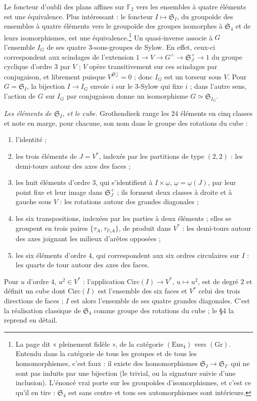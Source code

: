 \documentclass[11pt,a4paper]{article}
\begin{document}
Le foncteur d'oubli des plans affines sur $\mathbb{F}_2$ vers les ensembles à
quatre éléments est une équivalence. Plus intéressant : le foncteur
$I \mapsto \mathfrak{S}_I$, du groupoïde des ensembles à quatre éléments vers le
groupoïde des groupes isomorphes à $\mathfrak{S}_4$ et de leurs isomorphismes,
est une équivalence.\footnote{La page dit « pleinement fidèle », de la
catégorie $(\mathrm{Ens}_4)$ vers $(\mathrm{Gr})$. Entendu dans la catégorie de
tous les groupes et de tous les homomorphismes, c'est faux : il existe des
homomorphismes $\mathfrak{S}_I \to \mathfrak{S}_{I'}$ qui ne sont pas induits
par une bijection (le trivial, ou la signature suivie d'une inclusion). L'énoncé
vrai porte sur les groupoïdes d'isomorphismes, et c'est ce qu'il en tire :
$\mathfrak{S}_4$ est sans centre et tous ses automorphismes sont intérieurs.} Un
quasi-inverse associe à $G$ l'ensemble $I_G$ de ses quatre $3$-sous-groupes de
Sylow. En effet, ceux-ci correspondent aux scindages de l'extension
$1 \to V \to G^{+} \to \mathfrak{S}_J^{+} \to 1$ du groupe cyclique d'ordre $3$
par $V$ ; $V$ opère transitivement sur ces scindages par conjugaison, et
librement puisque $V^{\mathfrak{S}_J^{+}} = 0$ ; donc $I_G$ est un torseur sous
$V$. Pour $G = \mathfrak{S}_I$, la bijection $I \to I_G$ envoie $i$ sur le
$3$-Sylow qui fixe $i$ ; dans l'autre sens, l'action de $G$ sur $I_G$ par
conjugaison donne un isomorphisme $G \simeq \mathfrak{S}_{I_G}$.

\emph{Les éléments de $\mathfrak{S}_I$, et le cube.} Grothendieck range les
$24$ éléments en cinq classes et note en marge, pour chacune, son nom dans le
groupe des rotations du cube :
\begin{enumerate}
\item[a)] l'identité ;
\item[b)] les trois éléments de $J = V^{*}$, indexés par les partitions de type
$(2,2)$ : les demi-tours autour des axes des faces ;
\item[c)] les huit éléments d'ordre $3$, qui s'identifient à
$I \times \underline{\omega}$, $\underline{\omega} = \underline{\omega}(J)$, par
leur point fixe et leur image dans $\mathfrak{S}_J^{+}$ ; ils forment deux
classes à droite et à gauche sous $V$ : les rotations autour des grandes
diagonales ;
\item[d)] les six transpositions, indexées par les parties à deux éléments ;
elles se groupent en trois paires $\{\tau_A, \tau_{I \setminus A}\}$, de produit
dans $V^{*}$ : les demi-tours autour des axes joignant les milieux d'arêtes
opposées ;
\item[e)] les six éléments d'ordre $4$, qui correspondent aux six ordres
circulaires sur $I$ : les quarts de tour autour des axes des faces.
\end{enumerate}
Pour $u$ d'ordre $4$, $u^2 \in V^{*}$ : l'application
$\mathrm{Circ}(I) \to V^{*}$, $u \mapsto u^2$, est de degré $2$ et définit un
cube dont $\mathrm{Circ}(I)$ est l'ensemble des six faces et $V^{*}$ celui des
trois directions de faces ; $I$ est alors l'ensemble de ses quatre grandes
diagonales. C'est la réalisation classique de $\mathfrak{S}_4$ comme groupe des
rotations du cube ; le §4 la reprend en détail.
\end{document}
